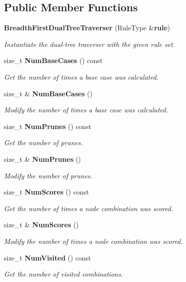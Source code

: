 \subsection*{Public Member Functions}
\begin{DoxyCompactItemize}
\item 
{\bf Breadth\+First\+Dual\+Tree\+Traverser} (Rule\+Type \&{\bf rule})
\begin{DoxyCompactList}\small\item\em Instantiate the dual-\/tree traverser with the given rule set. \end{DoxyCompactList}\item 
size\+\_\+t {\bf Num\+Base\+Cases} () const 
\begin{DoxyCompactList}\small\item\em Get the number of times a base case was calculated. \end{DoxyCompactList}\item 
size\+\_\+t \& {\bf Num\+Base\+Cases} ()
\begin{DoxyCompactList}\small\item\em Modify the number of times a base case was calculated. \end{DoxyCompactList}\item 
size\+\_\+t {\bf Num\+Prunes} () const 
\begin{DoxyCompactList}\small\item\em Get the number of prunes. \end{DoxyCompactList}\item 
size\+\_\+t \& {\bf Num\+Prunes} ()
\begin{DoxyCompactList}\small\item\em Modify the number of prunes. \end{DoxyCompactList}\item 
size\+\_\+t {\bf Num\+Scores} () const 
\begin{DoxyCompactList}\small\item\em Get the number of times a node combination was scored. \end{DoxyCompactList}\item 
size\+\_\+t \& {\bf Num\+Scores} ()
\begin{DoxyCompactList}\small\item\em Modify the number of times a node combination was scored. \end{DoxyCompactList}\item 
size\+\_\+t {\bf Num\+Visited} () const 
\begin{DoxyCompactList}\small\item\em Get the number of visited combinations. \end{DoxyCompactList}\item 

\end{DoxyCompactItemize}
